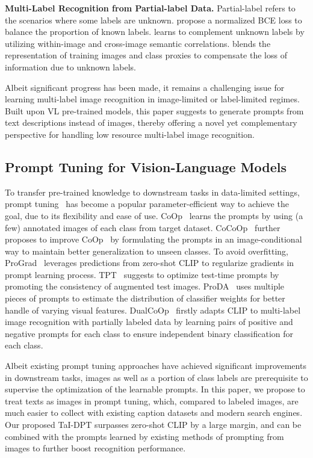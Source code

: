 \documentclass[10pt,twocolumn,letterpaper]{article}
\begin{document}
\noindent \textbf{Multi-Label Recognition from Partial-label Data.} Partial-label refers to the scenarios where some labels are unknown. \cite{durand2019learning} propose a normalized BCE loss to balance the proportion of known labels.
\cite{chen2022structured} learns to complement unknown labels by utilizing within-image and cross-image semantic correlations.
\cite{pu2022semantic} blends the representation of training images and class proxies to compensate the loss of information due to unknown labels.

Albeit significant progress has been made, it remains a challenging issue for learning multi-label image recognition in image-limited or label-limited regimes. 
Built upon VL pre-trained models, this paper suggests to generate prompts from text descriptions instead of images, thereby offering a novel yet complementary perspective for handling low resource multi-label image recognition.



\subsection{Prompt Tuning for Vision-Language Models}


To transfer pre-trained knowledge to downstream tasks in data-limited settings, prompt tuning~\cite{coop,zhu2022prompt,vpt,cpt,nps,ge2022domain} has become a popular parameter-efficient way to achieve the goal, due to its flexibility and ease of use.
CoOp~\cite{coop} learns the prompts by using (a few) annotated images of each class from target dataset. CoCoOp~\cite{cocoop} further proposes to improve CoOp~\cite{coop} by formulating the prompts in an image-conditional way to maintain better generalization to unseen classes.
To avoid overfitting, ProGrad~\cite{zhu2022prompt} leverages predictions from zero-shot CLIP to regularize gradients in prompt learning process.
TPT~\cite{shu2022test} suggests to optimize test-time prompts by promoting the consistency of augmented test images. 
ProDA~\cite{lu2022prompt} uses multiple pieces of prompts to estimate the distribution of classifier weights for better handle of varying visual features.
DualCoOp~\cite{dualcoop} firstly adapts CLIP to multi-label image recognition with partially labeled data by learning pairs of positive and negative prompts for each class to ensure independent binary classification for each class.

Albeit existing prompt tuning approaches have achieved significant improvements in downstream tasks, images as well as a portion of class labels are prerequisite to supervise the optimization of the learnable prompts. 
In this paper, we propose to treat texts as images in prompt tuning, which, compared to labeled images, are much easier to collect with existing caption datasets and modern search engines. 
Our proposed TaI-DPT surpasses zero-shot CLIP by a large margin, and can be combined with the prompts learned by existing methods of prompting from images to further boost recognition performance.
\end{document}
